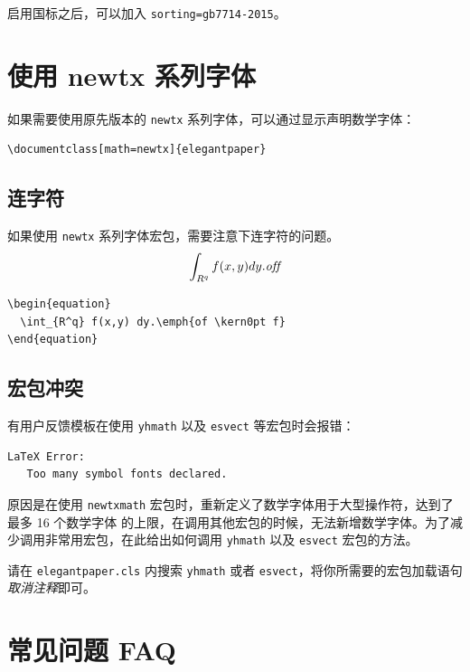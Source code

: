 \documentclass[lang=cn,a4paper,newtx]{elegantpaper}
\begin{document}
启用国标之后，可以加入 \lstinline{sorting=gb7714-2015}。


\section{使用 newtx 系列字体}

如果需要使用原先版本的 \lstinline{newtx} 系列字体，可以通过显示声明数学字体：

\begin{lstlisting}
\documentclass[math=newtx]{elegantpaper}
\end{lstlisting}

\subsection{连字符}

如果使用 \lstinline{newtx} 系列字体宏包，需要注意下连字符的问题。
\begin{equation}
  \int_{R^q} f(x,y) dy.\emph{of\kern0pt f}
\end{equation}

\begin{lstlisting}
\begin{equation}
  \int_{R^q} f(x,y) dy.\emph{of \kern0pt f}
\end{equation}
\end{lstlisting}

\subsection{宏包冲突}

有用户反馈模板在使用 \lstinline{yhmath} 以及 \lstinline{esvect} 等宏包时会报错：
\begin{lstlisting}
LaTeX Error:
   Too many symbol fonts declared.
\end{lstlisting}

原因是在使用 \lstinline{newtxmath} 宏包时，重新定义了数学字体用于大型操作符，达到了 {\heiti 最多 16 个数学字体} 的上限，在调用其他宏包的时候，无法新增数学字体。为了减少调用非常用宏包，在此给出如何调用 \lstinline{yhmath} 以及 \lstinline{esvect} 宏包的方法。

请在 \lstinline{elegantpaper.cls} 内搜索 \lstinline{yhmath} 或者 \lstinline{esvect}，将你所需要的宏包加载语句\textit{取消注释}即可。


\section{常见问题 FAQ}
\end{document}
